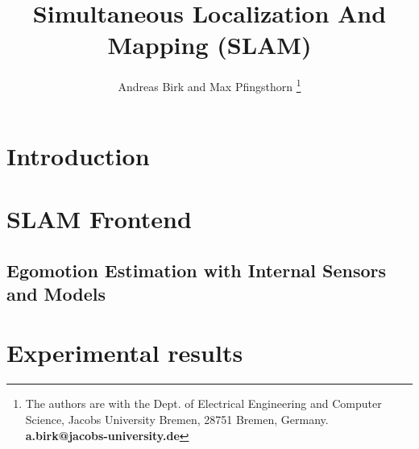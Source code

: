 \documentclass[english]{article}
\begin{document}
\title{Simultaneous Localization And Mapping (SLAM)}

\author{
Andreas Birk and Max Pfingsthorn
\thanks{The authors are with the Dept. of Electrical Engineering and Computer Science, Jacobs University Bremen, 28751 Bremen, Germany.
\textbf{a.birk@jacobs-university.de}}
}

\nocite{*}
\maketitle

\begin{abstract}

\end{abstract}

\section{Introduction}
\noindent

\section{SLAM Frontend}
\subsection{Egomotion Estimation with Internal Sensors and Models}
\noindent

\section{Experimental results}


{\small


}
\end{document}
